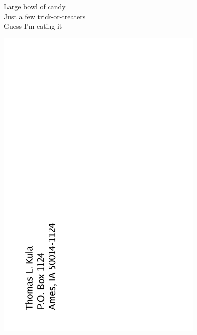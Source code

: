 \documentclass[12pt]{article}
\begin{document}
Large bowl of candy \\
Just a few trick-or-treaters \\
Guess I'm eating it

\newpage

\includegraphics[width=101mm]{backpage.png}
\end{document}
